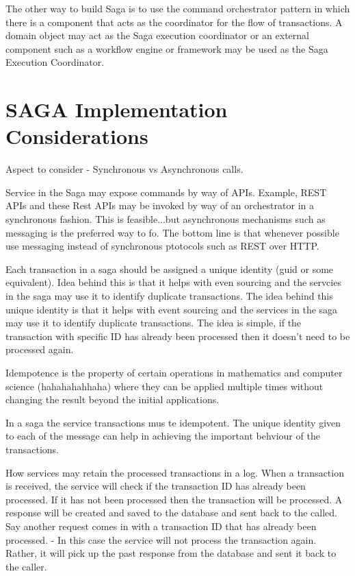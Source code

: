 The other way to build Saga is to use the command orchestrator pattern in which there is a component that acts as the coordinator for the flow of transactions.
A domain object may act as the Saga execution coordinator or an external component such as a workflow engine or framework may be used as the Saga Execution Coordinator.

\section{SAGA Implementation Considerations}
Aspect to consider - Synchronous vs Asynchronous calls.

Service in the Saga may expose commands by way of APIs. Example, REST APIs and these Rest APIs may be invoked by way of an orchestrator in a synchronous fashion.
This is feasible...but asynchronous mechanisms such as messaging is the preferred way to fo.
The bottom line is that whenever possible use messaging instead of synchronous ptotocols such as REST over HTTP.

Each transaction in a saga should be assigned a unique identity (guid or some equivalent). Idea behind this is that it helps with even sourcing and the servcies in the saga may use it to identify duplicate transactions.
The idea behind this unique identity is that it helps with event sourcing and the services in the saga may use it to identify duplicate transactions.
The idea is simple, if the transaction with specific ID has already been processed then it doesn't need to be processed again.

Idempotence is the property of certain operations in mathematics and computer science (hahahahahhaha) where they can be applied multiple times without changing the result beyond the initial applications.

In a saga the service transactions mus te idempotent. The unique identity given to each of the message can help in achieving the important behviour of the transactions.

How services may retain the processed transactions in a log.
When a transaction is received, the service will check if the transaction ID has already been processed.
If it has not been processed then the transaction will be processed.
A response will be created and saved to the database and sent back to the called.
Say another request comes in with a transaction  ID that has already been processed.
- In this case the service will not process the transaction again.
Rather, it will pick up the past response from the database and sent it back to the caller.

